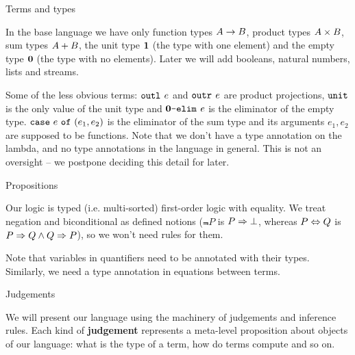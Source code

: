 \documentclass{beamer}
\begin{document}
\begin{frame}{Terms and types}

In the base language we have only function types $A \to B$, product types $A \times B$, sum types $A + B$, the unit type $\textbf{1}$ (the type with one element) and the empty type $\textbf{0}$ (the type with no elements). Later we will add booleans, natural numbers, lists and streams.

\vspace{1em}

Some of the less obvious terms: $\texttt{outl}_{}\ e$ and $\texttt{outr}_{}\ e$ are product projections, $\texttt{unit}$ is the only value of the unit type and $\textbf{0}\texttt{-elim}_{}\ e$ is the eliminator of the empty type. $\texttt{case}\ e\ \texttt{of}\ (e_1, e_2)$ is the eliminator of the sum type and its arguments $e_1, e_2$ are supposed to be functions. Note that we don't have a type annotation on the lambda, and no type annotations in the language in general. This is not an oversight -- we postpone deciding this detail for later.

\end{frame}

\begin{frame}{Propositions}

Our logic is typed (i.e. multi-sorted) first-order logic with equality. We treat negation and biconditional as defined notions ($\Not{P}$ is $P \Rightarrow \bot$, whereas $P \Leftrightarrow Q$ is $P \Rightarrow Q \land Q \Rightarrow P$), so we won't need rules for them.

\vspace{1em}

Note that variables in quantifiers need to be annotated with their types. Similarly, we need a type annotation in equations between terms.

\end{frame}

\begin{frame}{Judgements}

We will present our language using the machinery of judgements and inference rules. Each kind of \textbf{judgement} represents a meta-level proposition about objects of our language: what is the type of a term, how do terms compute and so on.

\end{frame}
\end{document}
